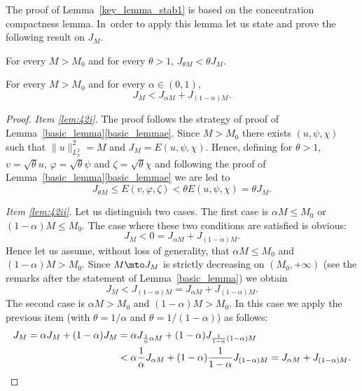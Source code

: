 The proof of Lemma~\ref{key_lemma_stab1} is based on the concentration compactness lemma. In~order to apply this lemma let us state and prove the following result on $J_{M}$.

\skpt
\begin{lemma}\label{lem:42}
\begin{enumeratei}
\item\label{lem:42i}
For every $M>M_{0}$ and for every $\theta>1$, $J_{\theta M}<\theta J_{M}$.
\item\label{lem:42ii}
For every $M>M_{0}$ and for every $\alpha\in(0,1)$,
\begin{equation}\label{sub_additivity}
J_{M}<J_{\alpha M}+J_{(1-\alpha)M}.
\end{equation}
\end{enumeratei}
\end{lemma}

\begin{proof}
\emph{Item \eqref{lem:42i}.} The proof follows the strategy of proof of Lemma~\ref{basic_lemma}\eqref{basic_lemmae}. Since $M>M_{0}$ there exists $(u,\psi,\chi)$ such that $\|u\|_{L_{x}^{2}}^{2}=M$ and $J_{M}=E(u,\psi,\chi)$. Hence, defining for $\theta>1$, $v=\sqrt{\theta}u$, $\varphi=\sqrt{\theta}\psi$ and $\zeta=\sqrt{\theta}\chi$ and following the proof of Lemma~\ref{basic_lemma}\eqref{basic_lemmae} we are led to
\[
J_{\theta M}\leq E(v,\varphi,\zeta)<\theta E(u,\psi,\chi)=\theta J_{M}.
\]

\emph{Item \eqref{lem:42ii}.} Let us distinguish two cases. The first case is $\alpha M\!\leq\!M_{0}$ or \hbox{$(1-\alpha)M\!\leq\!M_{0}$}. The case where these two conditions are satisfied is obvious:\vspace*{-3pt}
\[
J_{M}<0=J_{\alpha M}+J_{(1-\alpha)M}.
\]
Hence let us assume, without loss of generality, that $\alpha M\!\leq\! M_{0}$ and \hbox{$(1-\alpha)M\!>\!M_{0}$}. Since $M\mto J_{M}$ is strictly decreasing on $(M_{0},+\infty)$ (see the remarks after the statement of Lemma~\ref{basic_lemma}) we obtain\vspace*{-3pt}
\[
J_{M}<J_{(1-\alpha)M}=J_{\alpha M}+J_{(1-\alpha)M}.
\]
The second case is $\alpha M>M_{0}$ and $(1-\alpha)M>M_{0}$. In this case we apply the previous item (with $\theta =1/\alpha$ and $\theta=1/(1-\alpha)$) as follows:\vspace*{-3pt}
\begin{align*}
J_{M}=\alpha J_{M}+(1-\alpha)J_{M}&=\alpha J_{\frac{1}{\alpha}\alpha M}+(1-\alpha)J_{\frac{1}{1-\alpha}(1-\alpha)M}\\
&<\alpha\frac{1}{\alpha}J_{\alpha M}+(1-\alpha)\frac{1}{1-\alpha}J_{(1-\alpha)M}=J_{\alpha M}+J_{(1-\alpha)M}.\qedhere
\end{align*}
\end{proof}


